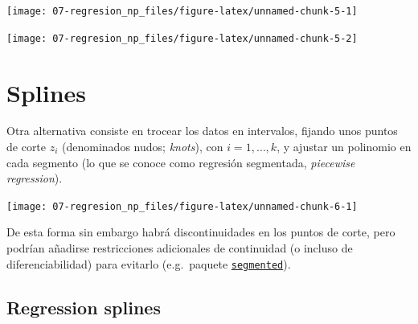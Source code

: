 \documentclass[
]{book}
\newenvironment{Shaded}{\begin{snugshade}}{\end{snugshade}}
\newcommand{\AttributeTok}[1]{\textcolor[rgb]{0.77,0.63,0.00}{#1}}
\newcommand{\CommentTok}[1]{\textcolor[rgb]{0.56,0.35,0.01}{\textit{#1}}}
\newcommand{\FunctionTok}[1]{\textcolor[rgb]{0.00,0.00,0.00}{#1}}
\newcommand{\NormalTok}[1]{#1}
\newcommand{\OtherTok}[1]{\textcolor[rgb]{0.56,0.35,0.01}{#1}}
\newcommand{\SpecialCharTok}[1]{\textcolor[rgb]{0.00,0.00,0.00}{#1}}
\newcommand{\StringTok}[1]{\textcolor[rgb]{0.31,0.60,0.02}{#1}}
\theoremstyle{break}
\theoremstyle{definition}
\theoremstyle{definition}
\theoremstyle{definition}
\theoremstyle{definition}
\theoremstyle{remark}
\begin{document}
\begin{center}\texttt{[image: 07-regresion\_np\_files/figure-latex/unnamed-chunk-5-1]} \end{center}

\begin{Shaded}
\end{Shaded}

\begin{center}\texttt{[image: 07-regresion\_np\_files/figure-latex/unnamed-chunk-5-2]} \end{center}

\hypertarget{splines}{%
\section{Splines}\label{splines}}

Otra alternativa consiste en trocear los datos en intervalos, fijando unos puntos de corte \(z_i\) (denominados nudos; \emph{knots}), con \(i = 1, \ldots, k\), y ajustar un polinomio en cada segmento (lo que se conoce como regresión segmentada, \emph{piecewise regression}).

\begin{center}\texttt{[image: 07-regresion\_np\_files/figure-latex/unnamed-chunk-6-1]} \end{center}

De esta forma sin embargo habrá discontinuidades en los puntos de corte, pero podrían añadirse restricciones adicionales de continuidad (o incluso de diferenciabilidad) para evitarlo (e.g.~paquete \href{https://CRAN.R-project.org/package=segmented}{\texttt{segmented}}).

\hypertarget{reg-splines}{%
\subsection{Regression splines}\label{reg-splines}}
\end{document}
